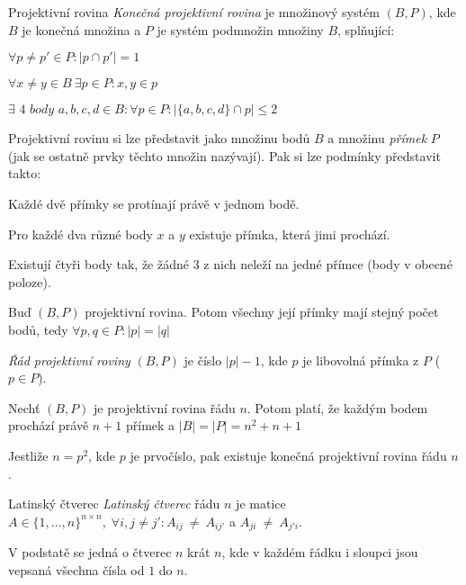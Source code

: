 \begin{definiceN}{Projektivní rovina}
\emph{Konečná projektivní rovina} je množinový systém $(B,P)$, kde $B$ je konečná množina a $P$ je systém podmnožin množiny $B$, splňující:
\begin{penumerate}
	\item $\forall p \neq p' \in P: |p \cap p'| = 1$
	\item $\forall x \neq y \in B~\exists p \in P: x,y \in p$
	\item $\exists \textit{ 4 body } a,b,c,d \in B: \forall p \in P: |\{a,b,c,d\} \cap p| \leq 2$
\end{penumerate}

Projektivní rovinu si lze představit jako množinu bodů $B$ a množinu \emph{přímek} $P$ (jak se ostatně prvky těchto množin nazývají). Pak si lze podmínky představit takto:
\begin{penumerate} 
    \item Každé dvě přímky se protínají právě v jednom bodě. 
    \item Pro každé dva různé body $x$ a $y$ existuje přímka, která jimi prochází. 
    \item Existují čtyři body tak, že žádné 3 z nich neleží na jedné přímce (body v obecné poloze).
\end{penumerate}
\end{definiceN}

\begin{veta}
Buď $(B,P)$ projektivní rovina. Potom všechny její přímky mají stejný počet bodů, tedy $\forall p,q \in P: |p| = |q|$
\end{veta}

\begin{definice}
\emph{Řád projektivní roviny} $(B, P)$ je číslo $|p|-1$, kde $p$ je libovolná přímka z $P$ ($p \in P$).
\end{definice}

\begin{veta}
Nechť $(B,P)$ je projektivní rovina řádu $n$. Potom platí, že každým bodem prochází právě $n+1$ přímek a $|B|=|P|=n^2+n+1$
\end{veta}

\begin{veta}
Jestliže $n=p^2$, kde $p$ je prvočíslo, pak existuje konečná projektivní rovina řádu $n$.
\end{veta}

\begin{definiceN}{Latinský čtverec}
\emph{Latinský čtverec} řádu $n$ je matice $A \in \{1, \dots, n\}^{n \times n}, \;\forall i, j \neq j': A_{ij}~\neq~A_{ij'}$ a $A_{ji}~\neq~A_{j'i}.$

V podstatě se jedná o čtverec $n$ krát $n$, kde v každém řádku i sloupci jsou vepsaná všechna čísla od $1$ do $n$.
\end{definiceN}


